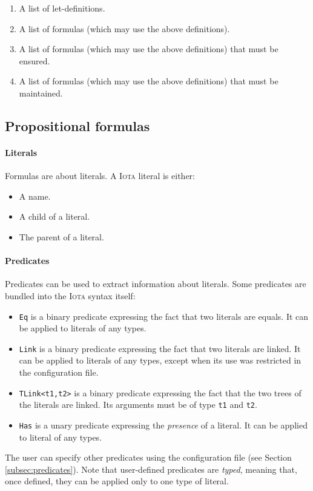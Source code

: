 \documentclass[10pt,a4paper]{article}
\newcommand\Iota{\textsc{Iota}}
\newcommand{\ocaml}{\texttt}
\begin{document}
\begin{enumerate}
\item A list of let-definitions.
\item A list of formulas (which may use the above definitions).
\item A list of formulas (which may use the above definitions) that must be ensured.
\item A list of formulas (which may use the above definitions) that must be maintained.
\end{enumerate}

\subsection{Propositional formulas}

\paragraph{Literals}
Formulas are about literals. A \Iota{} literal is either:
\begin{itemize}
\item A name.
\item A child of a literal.
\item The parent of a literal.
\end{itemize}

\paragraph{Predicates}
\label{para:predicates}
Predicates can be used to extract information about literals. Some predicates are bundled into the \Iota{} syntax itself:
\begin{itemize}
\item \ocaml{Eq} is a binary predicate expressing the fact that two literals are equals. It can be applied to literals of any types.
\item \ocaml{Link} is a binary predicate expressing the fact that two literals are linked. It can be applied to literals of any types, except when its use was restricted in the configuration file.
\item \ocaml{TLink<t1,t2>} is a binary predicate expressing the fact that the two trees of the literals are linked. Its arguments must be of type \ocaml{t1} and \ocaml{t2}.
\item \ocaml{Has} is a unary predicate expressing the \emph{presence} of a literal. It can be applied to literal of any types.
\end{itemize}
The user can specify other predicates using the configuration file (see Section \ref{subsec:predicates}). Note that user-defined predicates are \emph{typed}, meaning that, once defined, they can be applied only to one type of literal.
\end{document}
